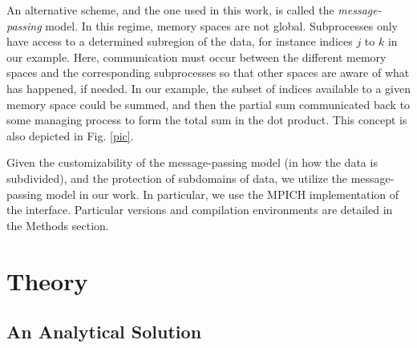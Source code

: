 \documentclass[reprint, amsmath, amssymb, aps, floatfix]{revtex4-1}
\begin{document}
An alternative scheme, and the one used in this work, is called the \textit{message-passing} model. In this regime, memory spaces are not global. Subprocesses only have access to a determined subregion of the data, for instance indices $j$ to $k$ in our example. Here, communication must occur between the different memory spaces and the corresponding subprocesses so that other spaces are aware of what has happened, if needed. In our example, the subset of indices available to a given memory space could be summed, and then the partial sum communicated back to some managing process to form the total sum in the dot product. This concept is also depicted in Fig. \ref{pic}.

Given the customizability of the message-passing model (in how the data is subdivided), and the protection of subdomains of data, we utilize the message-passing model in our work. In particular, we use the MPICH implementation of the interface. Particular versions and compilation environments are detailed in the Methods section.



\section{Theory}

\subsection{An Analytical Solution}
\end{document}
